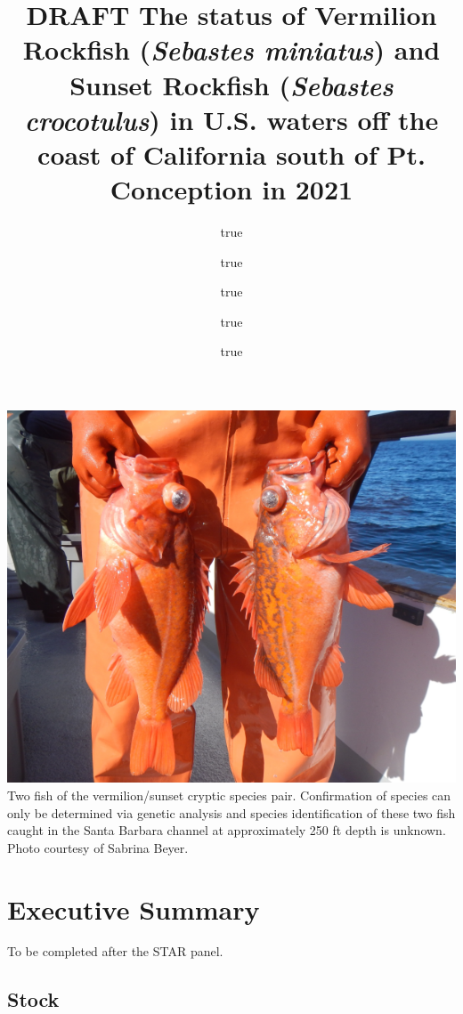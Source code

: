 \documentclass[
  english,
  a4paper,
]{article}
\title{DRAFT The status of Vermilion Rockfish (\emph{Sebastes miniatus}) and Sunset Rockfish (\emph{Sebastes crocotulus}) in U.S. waters off the coast of California south of Pt. Conception in 2021}
\author{true \and true \and true \and true \and true}
\date{}
\begin{document}
\maketitle

{
\setcounter{tocdepth}{2}
\tableofcontents
}
\newcommand\CapeM{$40^\circ 10^\prime N$}
\newcommand\PtC{$34^\circ 27^\prime N$}
\newcommand\CAOR{$42^\circ 00^\prime N$}

\newpage

\includegraphics{cover_photo.png}
Two fish of the vermilion/sunset cryptic species pair. Confirmation of
species can only be determined via genetic analysis and species identification
of these two fish caught in the Santa Barbara channel at approximately 250 ft depth
is unknown. Photo courtesy of Sabrina Beyer.

\pagebreak
{}
\setcounter{page}{1}

\renewcommand{\thetable}{\roman{table}}
\renewcommand{\thefigure}{\roman{figure}}

\setlength\parskip{0.5em plus 0.1em minus 0.2em}

\hypertarget{executive-summary}{%
\section*{Executive Summary}\label{executive-summary}}

To be completed after the STAR panel.

\hypertarget{stock}{%
\subsection*{Stock}\label{stock}}
\end{document}
